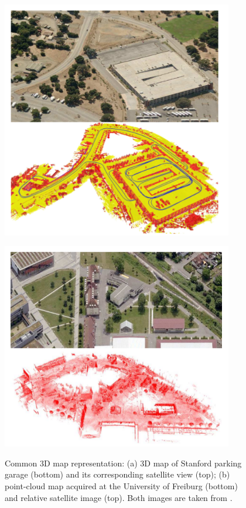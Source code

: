 \documentclass[10pt,a4paper, notitlepage]{report}
\begin{document}
\begin{figure}[h]
    \centering
    \begin{minipage}[t!]{0.5\textwidth}
        \centering
        \includegraphics[width=0.9\textwidth]{media/3Dmap.png}
        \label{fig:map_a}
    \end{minipage}%
    \begin{minipage}[t!]{0.5\textwidth}
        \centering
        \includegraphics[width=0.9\textwidth]{media/3Dpoint_cloud.png}
        \label{fig:map_b}
    \end{minipage}%
   
    \caption{Common 3D map representation: (a) 3D map of Stanford parking garage (bottom) and its corresponding satellite view (top); (b) point-cloud map acquired at the University of Freiburg (bottom) and relative satellite image (top). Both images are taken from \cite{grisetti2010tutorial}.} 
    \label{fig:map}
\end{figure}
\end{document}
